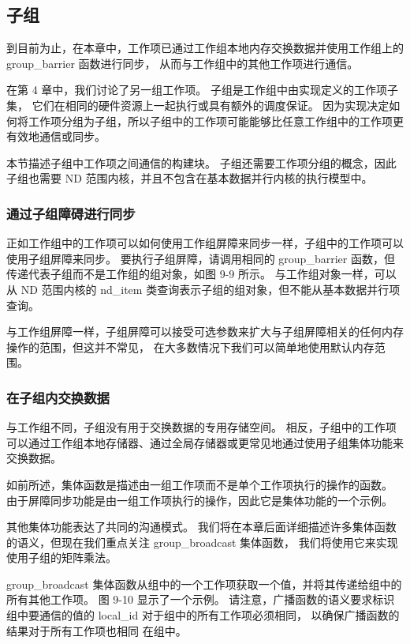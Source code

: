 \subsection{子组}
到目前为止，在本章中，工作项已通过工作组本地内存交换数据并使用工作组上的 group\_barrier 函数进行同步，
从而与工作组中的其他工作项进行通信。

在第 4 章中，我们讨论了另一组工作项。 子组是工作组中由实现定义的工作项子集，
它们在相同的硬件资源上一起执行或具有额外的调度保证。 
因为实现决定如何将工作项分组为子组，所以子组中的工作项可能能够比任意工作组中的工作项更有效地通信或同步。

本节描述子组中工作项之间通信的构建块。 
子组还需要工作项分组的概念，因此子组也需要 ND 范围内核，并且不包含在基本数据并行内核的执行模型中。

\subsubsection{通过子组障碍进行同步}
正如工作组中的工作项可以如何使用工作组屏障来同步一样，子组中的工作项可以使用子组屏障来同步。 
要执行子组屏障，请调用相同的 group\_barrier 函数，但传递代表子组而不是工作组的组对象，如图 9-9 所示。 
与工作组对象一样，可以从 ND 范围内核的 nd\_item 类查询表示子组的组对象，但不能从基本数据并行项查询。

与工作组屏障一样，子组屏障可以接受可选参数来扩大与子组屏障相关的任何内存操作的范围，但这并不常见，
在大多数情况下我们可以简单地使用默认内存范围。

\subsubsection{在子组内交换数据}
与工作组不同，子组没有用于交换数据的专用存储空间。 
相反，子组中的工作项可以通过工作组本地存储器、通过全局存储器或更常见地通过使用子组集体功能来交换数据。

如前所述，集体函数是描述由一组工作项而不是单个工作项执行的操作的函数。 
由于屏障同步功能是由一组工作项执行的操作，因此它是集体功能的一个示例。

其他集体功能表达了共同的沟通模式。 
我们将在本章后面详细描述许多集体函数的语义，但现在我们重点关注 group\_broadcast 集体函数，
我们将使用它来实现使用子组的矩阵乘法。

group\_broadcast 集体函数从组中的一个工作项获取一个值，并将其传递给组中的所有其他工作项。 
图 9-10 显示了一个示例。 
请注意，广播函数的语义要求标识组中要通信的值的 local\_id 对于组中的所有工作项必须相同，
以确保广播函数的结果对于所有工作项也相同 在组中。

